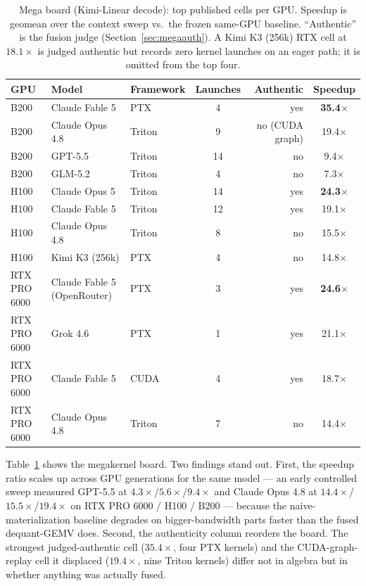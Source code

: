 \documentclass[11pt]{article}
\begin{document}
\begin{table}[t]
\centering
\small
\begin{tabular}{@{}lllcrc@{}}
\toprule
GPU & Model & Framework & Launches & Authentic & Speedup \\
\midrule
B200 & Claude Fable 5 & PTX & 4 & yes & \textbf{35.4$\times$} \\
B200 & Claude Opus 4.8 & Triton & 9 & no (CUDA graph) & 19.4$\times$ \\
B200 & GPT-5.5 & Triton & 14 & no & 9.4$\times$ \\
B200 & GLM-5.2 & Triton & 4 & no & 7.3$\times$ \\
\midrule
H100 & Claude Opus 5 & Triton & 14 & yes & \textbf{24.3$\times$} \\
H100 & Claude Fable 5 & Triton & 12 & yes & 19.1$\times$ \\
H100 & Claude Opus 4.8 & Triton & 8 & no & 15.5$\times$ \\
H100 & Kimi K3 (256k) & PTX & 4 & no & 14.8$\times$ \\
\midrule
RTX PRO 6000 & Claude Fable 5 (OpenRouter) & PTX & 3 & yes & \textbf{24.6$\times$} \\
RTX PRO 6000 & Grok 4.6 & PTX & 1 & yes & 21.1$\times$ \\
RTX PRO 6000 & Claude Fable 5 & CUDA & 4 & yes & 18.7$\times$ \\
RTX PRO 6000 & Claude Opus 4.8 & Triton & 7 & no & 14.4$\times$ \\
\bottomrule
\end{tabular}
\caption{Mega board (Kimi-Linear decode): top published cells per GPU. Speedup is geomean over the context sweep vs.\ the frozen same-GPU baseline. ``Authentic'' is the fusion judge (Section~\ref{sec:megaauth}). A Kimi K3 (256k) RTX cell at $18.1\times$ is judged authentic but records zero kernel launches on an eager path; it is omitted from the top four.}
\label{tab:mega}
\end{table}

Table~\ref{tab:mega} shows the megakernel board. Two findings stand out. First, the speedup ratio scales up across GPU generations for the same model --- an early controlled sweep measured GPT-5.5 at $4.3\times$/$5.6\times$/$9.4\times$ and Claude Opus 4.8 at $14.4\times$/$15.5\times$/$19.4\times$ on RTX PRO 6000 / H100 / B200 --- because the naive-materialization baseline degrades on bigger-bandwidth parts faster than the fused dequant-GEMV does. Second, the authenticity column reorders the board. The strongest judged-authentic cell ($35.4\times$, four PTX kernels) and the CUDA-graph-replay cell it displaced ($19.4\times$, nine Triton kernels) differ not in algebra but in whether anything was actually fused.
\end{document}
